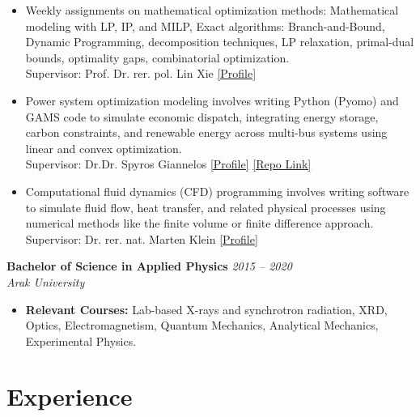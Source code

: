 \documentclass[10pt, a4paper]{article}
\begin{document}
\begin{itemize}[label={}]
    \item[-] Weekly assignments on mathematical optimization methods: Mathematical modeling with LP, IP, and MILP, Exact algorithms: Branch-and-Bound, Dynamic Programming, decomposition techniques, LP relaxation, primal-dual bounds, optimality gaps, combinatorial optimization.
  \\Supervisor: Prof. Dr. rer. pol. Lin Xie \href{https://www.b-tu.de/en/fg-wirtschaftsinformatik-analytics/team/professor#c432185}{[Profile]}
    \item[-] Power system optimization modeling involves writing Python (Pyomo) and GAMS code to simulate economic dispatch, integrating energy storage, carbon constraints, and renewable energy across multi-bus systems using linear and convex optimization. \\Supervisor: Dr.Dr. Spyros Giannelos
    \href{https://www.skool.com/@sp-ia-8683?g=software-school-for-energy-7177}{[Profile]} \href{https://github.com/AminAdineh/DED-power-system-economic-dispatch}{[Repo Link]}
    \item[-] Computational fluid dynamics (CFD) programming involves writing software to simulate fluid flow, heat transfer, and related physical processes using numerical methods like the finite volume or finite difference approach. \\Supervisor: Dr. rer. nat. Marten Klein \href{https://eiz-cottbus.de/en/meet-the-team-dr-rer-nat-marten-klein/}{[Profile]}
\end{itemize}
\vspace{0.4em}
\textbf{Bachelor of Science in Applied Physics} \hfill \textit{2015 -- 2020} \\
\textit{Arak University}
\begin{itemize}[label={}]
  \item \textbf{Relevant Courses:} Lab-based X-rays and synchrotron radiation, XRD, Optics, Electromagnetism, Quantum Mechanics, Analytical Mechanics, Experimental Physics.
\end{itemize}
\vspace{6\baselineskip}
\section*{Experience}
\end{document}
